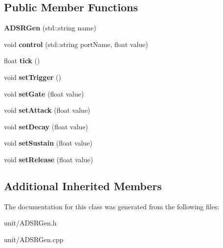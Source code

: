 \subsection*{Public Member Functions}
\begin{DoxyCompactItemize}
\item 
{\bfseries A\+D\+S\+R\+Gen} (std\+::string name)\hypertarget{classunit_1_1ADSRGen_a7e2d63eecbe51fc86a93697dd4d47964}{}\label{classunit_1_1ADSRGen_a7e2d63eecbe51fc86a93697dd4d47964}

\item 
void {\bfseries control} (std\+::string port\+Name, float value)\hypertarget{classunit_1_1ADSRGen_ac43bddd25b9a84f0ad6b299ed55f5133}{}\label{classunit_1_1ADSRGen_ac43bddd25b9a84f0ad6b299ed55f5133}

\item 
float {\bfseries tick} ()\hypertarget{classunit_1_1ADSRGen_a91a149fa5065d94dccec224b18710a24}{}\label{classunit_1_1ADSRGen_a91a149fa5065d94dccec224b18710a24}

\item 
void {\bfseries set\+Trigger} ()\hypertarget{classunit_1_1ADSRGen_a8685be5cffea6ec29dc1ebdc44402f70}{}\label{classunit_1_1ADSRGen_a8685be5cffea6ec29dc1ebdc44402f70}

\item 
void {\bfseries set\+Gate} (float value)\hypertarget{classunit_1_1ADSRGen_aee81e429433522eeb6362338fe15d551}{}\label{classunit_1_1ADSRGen_aee81e429433522eeb6362338fe15d551}

\item 
void {\bfseries set\+Attack} (float value)\hypertarget{classunit_1_1ADSRGen_a3a81f7181fa8b63f4ec5ff9da91cb8b3}{}\label{classunit_1_1ADSRGen_a3a81f7181fa8b63f4ec5ff9da91cb8b3}

\item 
void {\bfseries set\+Decay} (float value)\hypertarget{classunit_1_1ADSRGen_a14856bf0586881cbe088ab47918b7d72}{}\label{classunit_1_1ADSRGen_a14856bf0586881cbe088ab47918b7d72}

\item 
void {\bfseries set\+Sustain} (float value)\hypertarget{classunit_1_1ADSRGen_a07fa6e650dc1ffdde91fc0721d4a8dc8}{}\label{classunit_1_1ADSRGen_a07fa6e650dc1ffdde91fc0721d4a8dc8}

\item 
void {\bfseries set\+Release} (float value)\hypertarget{classunit_1_1ADSRGen_a8c2a3e60dcae34d077b5983b1584de71}{}\label{classunit_1_1ADSRGen_a8c2a3e60dcae34d077b5983b1584de71}

\end{DoxyCompactItemize}
\subsection*{Additional Inherited Members}


The documentation for this class was generated from the following files\+:\begin{DoxyCompactItemize}
\item 
unit/A\+D\+S\+R\+Gen.\+h\item 
unit/A\+D\+S\+R\+Gen.\+cpp\end{DoxyCompactItemize}
